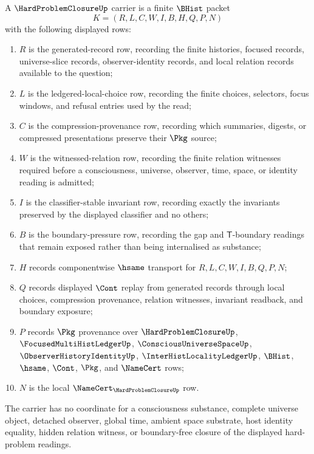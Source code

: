 \begin{definition}
\label{def:hard-problem-closure-carrier}
A $\HardProblemClosureUp$ carrier is a finite $\BHist$ packet
$$
K=(R,L,C,W,I,B,H,Q,P,N)
$$
with the following displayed rows:
\begin{enumerate}
\item $R$ is the generated-record row, recording the finite histories, focused records, universe-slice records, observer-identity records, and local relation records available to the question;
\item $L$ is the ledgered-local-choice row, recording the finite choices, selectors, focus windows, and refusal entries used by the read;
\item $C$ is the compression-provenance row, recording which summaries, digests, or compressed presentations preserve their $\Pkg$ source;
\item $W$ is the witnessed-relation row, recording the finite relation witnesses required before a consciousness, universe, observer, time, space, or identity reading is admitted;
\item $I$ is the classifier-stable invariant row, recording exactly the invariants preserved by the displayed classifier and no others;
\item $B$ is the boundary-pressure row, recording the gap and $\mathsf{T}$-boundary readings that remain exposed rather than being internalised as substance;
\item $H$ records componentwise $\hsame$ transport for $R,L,C,W,I,B,Q,P,N$;
\item $Q$ records displayed $\Cont$ replay from generated records through local choices, compression provenance, relation witnesses, invariant readback, and boundary exposure;
\item $P$ records $\Pkg$ provenance over $\HardProblemClosureUp$, $\FocusedMultiHistLedgerUp$, $\ConsciousUniverseSpaceUp$, $\ObserverHistoryIdentityUp$, $\InterHistLocalityLedgerUp$, $\BHist$, $\hsame$, $\Cont$, $\Pkg$, and $\NameCert$ rows;
\item $N$ is the local $\NameCert_{\HardProblemClosureUp}$ row.
\end{enumerate}
The carrier has no coordinate for a consciousness substance, complete universe object, detached observer, global time, ambient space substrate, host identity equality, hidden relation witness, or boundary-free closure of the displayed hard-problem readings.
\end{definition}

